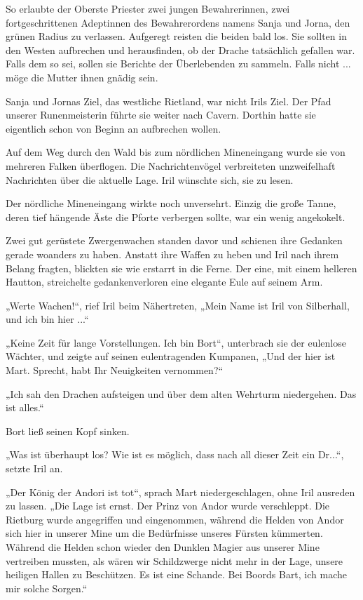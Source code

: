 So erlaubte der Oberste Priester zwei jungen Bewahrerinnen, zwei fortgeschrittenen Adeptinnen des Bewahrerordens namens Sanja und Jorna, den grünen Radius zu verlassen. Aufgeregt reisten die beiden bald los. Sie sollten in den Westen aufbrechen und herausfinden, ob der Drache tatsächlich gefallen war. Falls dem so sei, sollen sie Berichte der Überlebenden zu sammeln. Falls nicht ... möge die Mutter ihnen gnädig sein.\bigskip







Sanja und Jornas Ziel, das westliche Rietland, war nicht Irils Ziel. Der Pfad unserer Runenmeisterin führte sie weiter nach Cavern. Dorthin hatte sie eigentlich schon von Beginn an aufbrechen wollen.

Auf dem Weg durch den Wald bis zum nördlichen Mineneingang wurde sie von mehreren Falken überflogen. Die Nachrichtenvögel verbreiteten unzweifelhaft Nachrichten über die aktuelle Lage. Iril wünschte sich, sie zu lesen.

Der nördliche Mineneingang wirkte noch unversehrt. Einzig die große Tanne, deren tief hängende Äste die Pforte verbergen sollte, war ein wenig angekokelt.

Zwei gut gerüstete Zwergenwachen standen davor und schienen ihre Gedanken gerade woanders zu haben. Anstatt ihre Waffen zu heben und Iril nach ihrem Belang fragten, blickten sie wie erstarrt in die Ferne. Der eine, mit einem helleren Hautton, streichelte gedankenverloren eine elegante Eule auf seinem Arm.

„Werte Wachen!“, rief Iril beim Nähertreten, „Mein Name ist Iril von Silberhall, und ich bin hier ...“

„Keine Zeit für lange Vorstellungen. Ich bin Bort“, unterbrach sie der eulenlose Wächter, und zeigte auf seinen eulentragenden Kumpanen, „Und der hier ist Mart. Sprecht, habt Ihr Neuigkeiten vernommen?“

„Ich sah den Drachen aufsteigen und über dem alten Wehrturm niedergehen. Das ist alles.“

Bort ließ seinen Kopf sinken.

„Was ist überhaupt los? Wie ist es möglich, dass nach all dieser Zeit ein Dr...“, setzte Iril an.

„Der König der Andori ist tot“, sprach Mart niedergeschlagen, ohne Iril ausreden zu lassen. „Die Lage ist ernst. Der Prinz von Andor wurde verschleppt. Die Rietburg wurde angegriffen und eingenommen, während die Helden von Andor sich hier in unserer Mine um die Bedürfnisse unseres Fürsten kümmerten. Während die Helden schon wieder den Dunklen Magier aus unserer Mine vertreiben mussten, als wären wir Schildzwerge nicht mehr in der Lage, unsere heiligen Hallen zu Beschützen. Es ist eine Schande. Bei Boords Bart, ich mache mir solche Sorgen.“

